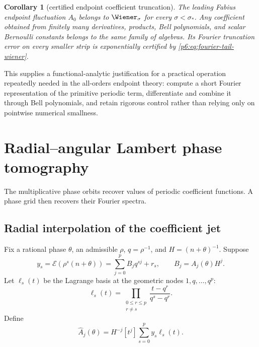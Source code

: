 \documentclass[11pt]{article}
\numberwithin{equation}{section}
\newtheorem{corollary}[theorem]{Corollary}
\theoremstyle{definition}
\theoremstyle{remark}
\begin{document}
\begin{corollary}[certified endpoint coefficient truncation]
\label{p6:cor:certified-bell}
The leading Fabius endpoint fluctuation $A_0$ belongs to $\Wiener_\sigma$ for every
$\sigma<\sigma_*$.  Any coefficient obtained from finitely many derivatives, products,
Bell polynomials, and scalar Bernoulli constants belongs to the same family of algebras.
Its Fourier truncation error on every smaller strip is exponentially certified by
\eqref{p6:eq:fourier-tail-wiener}.
\end{corollary}

This supplies a functional-analytic justification for a practical operation repeatedly
needed in the all-orders endpoint theory: compute a short Fourier representation of the
primitive periodic term, differentiate and combine it through Bell polynomials, and retain
rigorous control rather than relying only on pointwise numerical smallness.

\section{Radial--angular Lambert phase tomography}
\label{p6:sec:tomography}

The multiplicative phase orbits recover values of periodic coefficient functions.  A phase
grid then recovers their Fourier spectra.

\subsection{Radial interpolation of the coefficient jet}

Fix a rational phase $\theta$, an admissible $\rho$, $q=\rho^{-1}$, and
$H=(n+\theta)^{-1}$.  Suppose
\begin{equation}
 y_s=\mathscr E(\rho^s(n+\theta))
 =\sum_{j=0}^{p}B_jq^{sj}+r_s,
 \qquad B_j=A_j(\theta)H^j.
 \label{p6:eq:radial-polynomial-model}
\end{equation}
Let $\ell_s(t)$ be the Lagrange basis at the geometric nodes
$1,q,\ldots,q^p$:
\begin{equation}
 \ell_s(t)=\prod_{\substack{0\le r\le p\\r\ne s}}
 \frac{t-q^r}{q^s-q^r}.
 \label{p6:eq:geometric-lagrange-basis}
\end{equation}
Define
\begin{equation}
 \widehat A_j(\theta)
 =H^{-j}[t^j]\sum_{s=0}^{p}y_s\ell_s(t).
 \label{p6:eq:radial-jet-estimator}
\end{equation}
\end{document}
